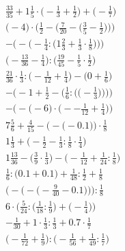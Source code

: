 \documentclass[8pt]{article}
\begin{document}
\begin{align}
\frac{33}{35} + 1\frac{1}{5} \cdot \big(-\frac{1}{3} + \frac{1}{2}\big) + \big(-\frac{1}{7}\big) \\
\bigg(-4\bigg) \cdot \bigg(\frac{1}{2} - \Big(\frac{7}{20} - \big(\frac{3}{5} - \frac{1}{2}\big)\Big)\bigg) \\
-\bigg(-\Big(-\frac{1}{4} : \big(1\frac{2}{3} + \frac{1}{3} \cdot \frac{1}{8}\big)\Big)\bigg) \\
\big(-\frac{13}{36} - \frac{1}{4}\big) : \big(\frac{19}{45} - \frac{1}{5} \cdot \frac{1}{2}\big) \\
\frac{21}{36} \cdot \frac{1}{3} : \big(-\frac{1}{12} + \frac{1}{4}\big) - \big(0 + \frac{1}{6}\big) \\
-\Bigg(-1 + \frac{1}{2} - \bigg(\frac{1}{6} : \Big(\big(-\frac{1}{3}\big)\Big)\bigg)\Bigg) \\
-\Big(-\big(-6\big) \cdot \big(--\frac{1}{12} + \frac{1}{4}\big)\Big) \\
7\frac{5}{6} + \frac{4}{15} - \Big(-\big(-0.1\big)\Big) \cdot \frac{1}{8} \\
1\frac{1}{3} + \big(-\frac{1}{2} - \frac{1}{3} : \frac{1}{8} \cdot \frac{1}{4}\big) \\
1\frac{13}{36} - \big(\frac{3}{9} \cdot \frac{1}{3}\big) - \big(-\frac{1}{12} + \frac{1}{24} : \frac{1}{8}\big) \\
\frac{1}{6} : \big(0.1 + 0.1\big) + \frac{1}{48} : \frac{1}{2} + \frac{1}{8} \\
\bigg(-\Big(-\big(-\frac{9}{40} - 0.1\big)\Big)\bigg) : \frac{1}{8} \\
6 \cdot \Big(\frac{5}{24} : \big(\frac{1}{18} : \frac{1}{9}\big) + \big(-\frac{1}{4}\big)\Big) \\
-\frac{1}{30} + 1 \cdot \frac{1}{3} : \frac{1}{3} + 0.7 \cdot \frac{1}{7} \\
\big(-\frac{1}{72} + \frac{1}{9}\big) : \big(-\frac{1}{56} + \frac{1}{49} : \frac{1}{7}\big)
\end{align}
\end{document}

